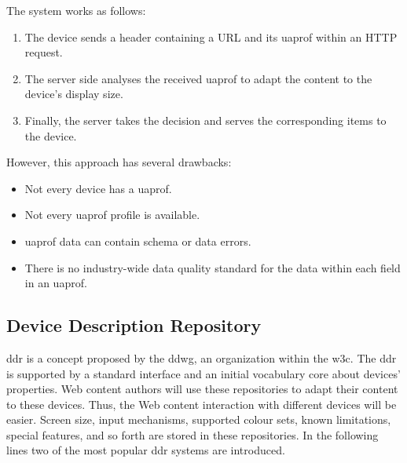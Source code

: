 The system works as follows:

\begin{enumerate}
  \item The device sends a header containing a URL and its \ac{uaprof} within an 
  HTTP request.
  \item The server side analyses the received \ac{uaprof} to adapt the content 
  to the device's display size.
  \item Finally, the server takes the decision and serves the corresponding items
  to the device.
\end{enumerate}


However, this approach has several drawbacks:

\begin{itemize}
 \item Not every device has a \ac{uaprof}.
 \item Not every \ac{uaprof} profile is available.
 \item \ac{uaprof} data can contain schema or data errors.
 \item There is no industry-wide data quality standard for the data within each
 field in an \ac{uaprof}.
\end{itemize}


% 

\subsection{Device Description Repository}
\label{sec:ddr}
\ac{ddr} is a concept proposed by the \ac{ddwg}, an organization within the 
\ac{w3c}. The \ac{ddr} is supported by a standard interface and an initial 
vocabulary core about devices' properties. Web content authors will use these 
repositories to adapt their content to these devices. Thus, the Web content 
interaction with different devices will be easier. Screen size, input mechanisms, 
supported colour sets, known limitations, special features, and so forth are 
stored in these repositories. In the following lines two of the most popular
\ac{ddr} systems are introduced.

